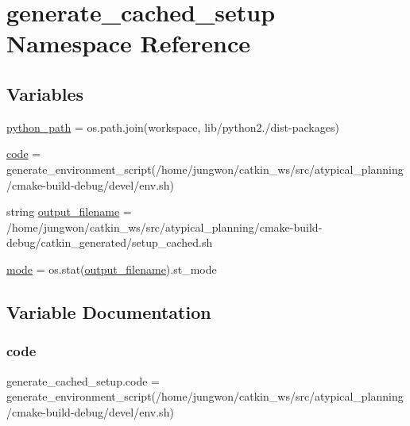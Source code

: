 \hypertarget{namespacegenerate__cached__setup}{}\section{generate\+\_\+cached\+\_\+setup Namespace Reference}
\label{namespacegenerate__cached__setup}
\subsection*{Variables}
\begin{DoxyCompactItemize}
\item 
\hyperlink{namespacegenerate__cached__setup_a72579fd01529a79bab20d99291889d3f}{python\+\_\+path} = os.\+path.\+join(workspace, \textquotesingle{}lib/python2./dist-\/packages\textquotesingle{})
\item 
\hyperlink{namespacegenerate__cached__setup_a52601295006f2366a311c4453d8f2f2e}{code} = generate\+\_\+environment\+\_\+script(\textquotesingle{}/home/jungwon/catkin\+\_\+ws/src/atypical\+\_\+planning/cmake-\/build-\/debug/devel/env.\+sh\textquotesingle{})
\item 
string \hyperlink{namespacegenerate__cached__setup_a0265aee5075ee1eb701ff69c98ad6793}{output\+\_\+filename} = \textquotesingle{}/home/jungwon/catkin\+\_\+ws/src/atypical\+\_\+planning/cmake-\/build-\/debug/catkin\+\_\+generated/setup\+\_\+cached.\+sh\textquotesingle{}
\item 
\hyperlink{namespacegenerate__cached__setup_a10081e5abedae9bd46dd91202096e789}{mode} = os.\+stat(\hyperlink{namespacegenerate__cached__setup_a0265aee5075ee1eb701ff69c98ad6793}{output\+\_\+filename}).st\+\_\+mode
\end{DoxyCompactItemize}


\subsection{Variable Documentation}
\mbox{\label{namespacegenerate__cached__setup_a52601295006f2366a311c4453d8f2f2e}} 
\subsubsection{\texorpdfstring{code}{code}}
{\footnotesize\ttfamily generate\+\_\+cached\+\_\+setup.\+code = generate\+\_\+environment\+\_\+script(\textquotesingle{}/home/jungwon/catkin\+\_\+ws/src/atypical\+\_\+planning/cmake-\/build-\/debug/devel/env.\+sh\textquotesingle{})}



